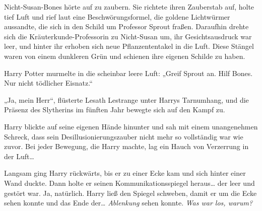 Nicht-Susan-Bones hörte auf zu zaubern. Sie richtete ihren Zauberstab auf, holte tief Luft und rief laut eine Beschwörungsformel, die goldene Lichtwürmer aussandte, die sich in den Schild um Professor Sprout fraßen. Daraufhin drehte sich die Kräuterkunde-Professorin zu Nicht-Susan um, ihr Gesichtsausdruck war leer, und hinter ihr erhoben sich neue Pflanzententakel in die Luft. Diese Stängel waren von einem dunkleren Grün und schienen ihre eigenen Schilde zu haben.

Harry Potter murmelte in die scheinbar leere Luft: „Greif Sprout an. Hilf Bones. Nur nicht tödlicher Eisnatz.“

„Ja, mein Herr“, flüsterte Lesath Lestrange unter Harrys Tarnumhang, und die Präsenz des Slytherins im fünften Jahr bewegte sich auf den Kampf zu.

Harry blickte auf seine eigenen Hände hinunter und sah mit einem unangenehmen Schreck, dass sein Desillusionierungszauber nicht mehr so vollständig war wie zuvor.
Bei jeder Bewegung, die Harry machte, lag ein Hauch von Verzerrung in der Luft…

Langsam ging Harry rückwärts, bis er zu einer Ecke kam und sich hinter einer Wand duckte. Dann holte er seinen Kommunikationsspiegel heraus… der leer und gestört war. Ja, natürlich. Harry ließ den Spiegel schweben, damit er um die Ecke sehen konnte und das Ende der… \emph{Ablenkung} sehen konnte.
\emph{Was war los, warum?}

